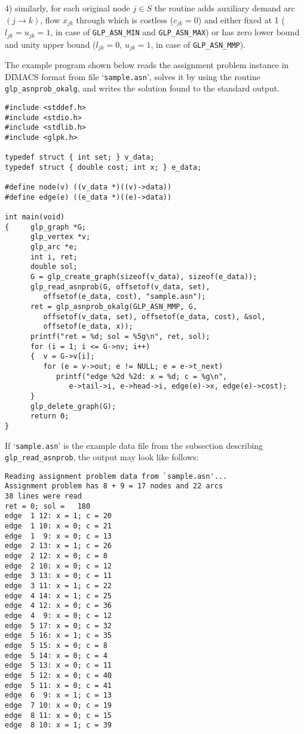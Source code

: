 \documentclass[11pt]{report}
\def\para#1{\noindent{\bf#1}}
\begin{document}
\newpage

4) similarly, for each original node $j\in S$ the routine adds
auxiliary demand arc $(j\rightarrow k)$, flow $x_{jk}$ through which is
costless ($c_{jk}=0$) and either fixed at 1 ($l_{jk}=u_{jk}=1$, in case
of \verb|GLP_ASN_MIN| and \verb|GLP_ASN_MAX|) or has zero lower bound
and unity upper bound ($l_{jk}=0$, $u_{jk}=1$, in case of
\verb|GLP_ASN_MMP|).

\para{Example}

The example program shown below reads the assignment problem instance
in DIMACS format from file `\verb|sample.asn|', solves it by using the
routine \verb|glp_asnprob_okalg|, and writes the solution found to the
standard output.

\begin{footnotesize}
\begin{verbatim}
#include <stddef.h>
#include <stdio.h>
#include <stdlib.h>
#include <glpk.h>

typedef struct { int set; } v_data;
typedef struct { double cost; int x; } e_data;

#define node(v) ((v_data *)((v)->data))
#define edge(e) ((e_data *)((e)->data))

int main(void)
{     glp_graph *G;
      glp_vertex *v;
      glp_arc *e;
      int i, ret;
      double sol;
      G = glp_create_graph(sizeof(v_data), sizeof(e_data));
      glp_read_asnprob(G, offsetof(v_data, set),
         offsetof(e_data, cost), "sample.asn");
      ret = glp_asnprob_okalg(GLP_ASN_MMP, G,
         offsetof(v_data, set), offsetof(e_data, cost), &sol,
         offsetof(e_data, x));
      printf("ret = %d; sol = %5g\n", ret, sol);
      for (i = 1; i <= G->nv; i++)
      {  v = G->v[i];
         for (e = v->out; e != NULL; e = e->t_next)
            printf("edge %2d %2d: x = %d; c = %g\n",
               e->tail->i, e->head->i, edge(e)->x, edge(e)->cost);
      }
      glp_delete_graph(G);
      return 0;
}
\end{verbatim}
\end{footnotesize}

If `\verb|sample.asn|' is the example data file from the subsection
describing \verb|glp_read_asnprob|, the output may look like follows:

\begin{footnotesize}
\begin{verbatim}
Reading assignment problem data from `sample.asn'...
Assignment problem has 8 + 9 = 17 nodes and 22 arcs
38 lines were read
ret = 0; sol =   180
edge  1 12: x = 1; c = 20
edge  1 10: x = 0; c = 21
edge  1  9: x = 0; c = 13
edge  2 13: x = 1; c = 26
edge  2 12: x = 0; c = 8
edge  2 10: x = 0; c = 12
edge  3 13: x = 0; c = 11
edge  3 11: x = 1; c = 22
edge  4 14: x = 1; c = 25
edge  4 12: x = 0; c = 36
edge  4  9: x = 0; c = 12
edge  5 17: x = 0; c = 32
edge  5 16: x = 1; c = 35
edge  5 15: x = 0; c = 8
edge  5 14: x = 0; c = 4
edge  5 13: x = 0; c = 11
edge  5 12: x = 0; c = 40
edge  5 11: x = 0; c = 41
edge  6  9: x = 1; c = 13
edge  7 10: x = 0; c = 19
edge  8 11: x = 0; c = 15
edge  8 10: x = 1; c = 39
\end{verbatim}
\end{footnotesize}
\end{document}
